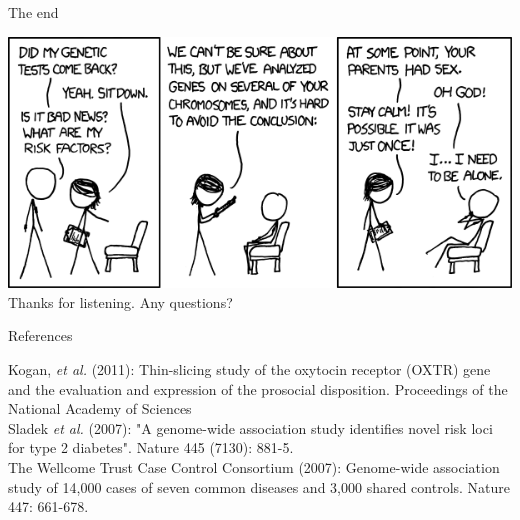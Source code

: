 \documentclass[12pt,a4paper]{beamer}
\begin{document}
\begin{frame}{The end}
\begin{center}
\includegraphics[scale=0.5]{genetic_analysis.png} \\
Thanks for listening. Any questions?
\end{center}
\end{frame}


\begin{frame}{References}
\begin{tiny}
Kogan, \textit{et al.} (2011): Thin-slicing study of the oxytocin receptor (OXTR) gene and the evaluation and expression of the prosocial disposition. Proceedings of the National Academy of Sciences\\
Sladek \textit{et al.} (2007): "A genome-wide association study identifies novel risk loci for type 2 diabetes". Nature 445 (7130): 881-5. \\
The Wellcome Trust Case Control Consortium  (2007): Genome-wide association study of 14,000 cases of seven common diseases and 3,000 shared controls. Nature 447: 661-678.\\
\end{tiny}
\end{frame}
\end{document}
